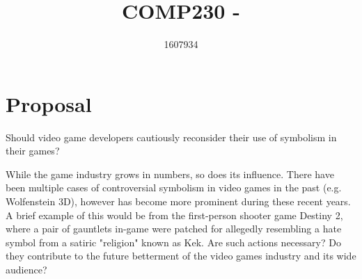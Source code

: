 \documentclass{scrartcl}
\title{COMP230 - }
\author{1607934}
\begin{document}
\maketitle

\section{Proposal}
Should video game developers cautiously reconsider their use of symbolism in their games?

While the game industry grows in numbers, so does its influence. There have been multiple cases of controversial symbolism in video games in the past (e.g. Wolfenstein 3D), however has become more prominent during these recent years. A brief example of this would be from the first-person shooter game Destiny 2, where a pair of gauntlets in-game were patched for allegedly resembling a hate symbol from a satiric "religion" known as Kek. Are such actions necessary? Do they contribute to the future betterment of the video games industry and its wide audience?




\end{document}
